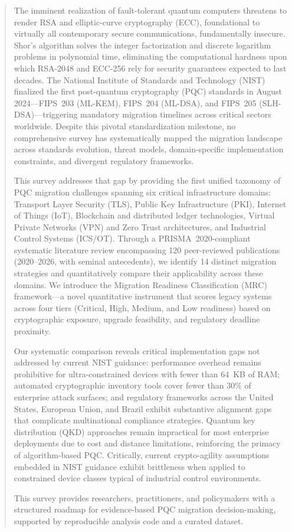 \documentclass[journal]{IEEEtran}
\begin{document}
\begin{abstract}
The imminent realization of fault-tolerant quantum computers threatens to render
RSA and elliptic-curve cryptography (ECC), foundational to virtually all
contemporary secure communications, fundamentally insecure. Shor's algorithm
solves the integer factorization and discrete logarithm problems in polynomial
time, eliminating the computational hardness upon which RSA-2048 and ECC-256
rely for security guarantees expected to last decades. The National Institute of
Standards and Technology (NIST) finalized the first post-quantum cryptography
(PQC) standards in August 2024---FIPS~203 (ML-KEM), FIPS~204 (ML-DSA), and
FIPS~205 (SLH-DSA)---triggering mandatory migration timelines across critical
sectors worldwide. Despite this pivotal standardization milestone, no
comprehensive survey has systematically mapped the migration landscape across
standards evolution, threat models, domain-specific implementation constraints,
and divergent regulatory frameworks.

This survey addresses that gap by providing the first unified taxonomy of PQC
migration challenges spanning six critical infrastructure domains: Transport
Layer Security (TLS), Public Key Infrastructure (PKI), Internet of Things (IoT),
Blockchain and distributed ledger technologies, Virtual Private Networks (VPN)
and Zero Trust architectures, and Industrial Control Systems (ICS/OT). Through
a PRISMA~2020-compliant systematic literature review encompassing 120 peer-reviewed
publications (2020--2026, with seminal antecedents), we identify 14 distinct
migration strategies and quantitatively compare their applicability across these
domains. We introduce the Migration Readiness Classification (MRC) framework---a
novel quantitative instrument that scores legacy systems across four tiers
(Critical, High, Medium, and Low readiness) based on cryptographic exposure,
upgrade feasibility, and regulatory deadline proximity.

Our systematic comparison reveals critical implementation gaps not addressed by
current NIST guidance: performance overhead remains prohibitive for ultra-constrained
devices with fewer than 64~KB of RAM; automated cryptographic inventory tools
cover fewer than 30\% of enterprise attack surfaces; and regulatory frameworks
across the United States, European Union, and Brazil exhibit substantive alignment
gaps that complicate multinational compliance strategies. Quantum key distribution
(QKD) approaches remain impractical for most enterprise deployments due to cost
and distance limitations, reinforcing the primacy of algorithm-based PQC.
Critically, current crypto-agility assumptions embedded in NIST guidance exhibit
brittleness when applied to constrained device classes typical of industrial
control environments.

This survey provides researchers, practitioners, and policymakers with a
structured roadmap for evidence-based PQC migration decision-making, supported
by reproducible analysis code and a curated dataset.
\end{abstract}
\end{document}
